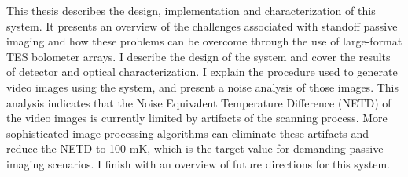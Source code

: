 \documentclass[12pt,letterpaper]{memoir}
\numberwithin{equation}{chapter}
\numberwithin{figure}{chapter}
\numberwithin{table}{chapter}
\begin{document}
This thesis describes the design, implementation and characterization of this system.
It presents an overview of the challenges associated with standoff passive imaging and how these problems can be overcome through the use of large-format TES bolometer arrays.
I describe the design of the system and cover the results of detector and optical characterization.
I explain the procedure used to generate video images using the system, and present a noise analysis of those images.
This analysis indicates that the Noise Equivalent Temperature Difference (NETD) of the video images is currently limited by artifacts of the scanning process.
More sophisticated image processing algorithms can eliminate these artifacts and reduce the NETD to 100 mK, which is the target value for demanding passive imaging scenarios.
I finish with an overview of future directions for this system.

\newpage

\tableofcontents* %

\newpage
\listoftables

\newpage
\listoffigures

\mainmatter

















\SingleSpacing
\printbibliography
\end{document}
